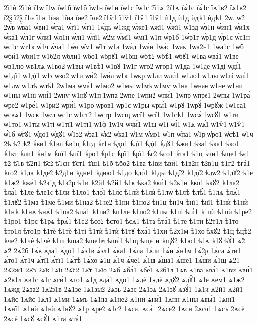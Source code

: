 {2ї1ѝ
2ї1ѝ
ї1ѡ
ї1ѡ
їѡ1б
їѡ1б
їѡ1н
їѡ1н
їѡ1с
їѡ1с
2ї1ѧ
2ї1ѧ
їѧ́1с
їѧ́1с
їѧ1в2
їѧ1в2
ї2ѯ
ї2ѯ
ї1ѳ
ї1ѳ
1їѳа
1їѳа
їѳе2
їѳе2
ї1ѷ1
ї1ѷ1
ї1ѷ1
ї1ѷ1
ѝ1д
ѝ1д
ѝдѣ1
ѝдѣ1
2ѡ.
ѡ2́
2ѡ́в
ѡ́ва1
ѡ́ви1
ѡ́га1
ѡ́гї1
ѡ́гї1
1ѡ́дь
ѡ́1жд
ѡ́же1
ѡ́жї1
ѡ́жї1
ѡ́1зд
ѡ́з1н
ѡ́ин1
ѡ́и1х
ѡ́ка1
ѡ́л1г
ѡ́ли1
ѡ́л1н
ѡ́лї1
ѡ́лї1
ѡ́2м
ѡ́мї1
ѡ́мї1
ѡ́1п
ѡ́р1б
1ѡ́р1г
ѡ́р1д
ѡ́р1с
ѡ́с1н
ѡ́с1с
ѡ́т1к
ѡ́1ч
ѡ́ча1
1ѡ́ѳ
ѡ̑м1
ѡ̑1т
ѡ1а
1ѡа́д
1ѡа́н
1ѡа́с
1ѡак
1ѡа2н1
1ѡа1с
1ѡб
ѡби́1
ѡби1т
ѡ1б2л
ѡбли1
ѡбо1
ѡбрꙋ1
ѡ1бщ
ѡбѣ2
ѡбѣ́1
ѡбꙋ1
ѡ1ва
ѡва́1
ѡ1ве
ѡв1лю
ѡв1лѧ
ѡ1во2
ѡ1вы
ѡ1вѣ1
ѡ1вꙋ
1ѡ1г
ѡго2
ѡгор1
ѡ1да
1ѡ1де
ѡ1ді
ѡді́1
ѡ1дї1
ѡ1дї1
ѡ1з
ѡзо2
ѡ1и
ѡи́2
1ѡи́л
ѡ1к
1ѡкр
ѡ1ли
ѡли́1
ѡ1ло1
ѡ1лы
ѡ1лі
ѡлі́1
ѡ1лѡ
ѡ1лѣ
ѡлѣ́1
2ѡ1ма
ѡма́1
ѡ1мо2
ѡ1мы
ѡ1мѣ
ѡ1мѵ
ѡ1на
1ѡнаѳ
ѡ1не
ѡ1ни
ѡ1ны
ѡ1ні
ѡні́1
2ѡнѵ
ѡ1нꙋ
ѡ1п
1ѡпа
2ѡпе
1ѡпи2
ѡпи́1
1ѡпр
ѡпре1
2ѡпы
1ѡ1ра́
ѡре2
ѡ1ре́1
ѡ1ри2
ѡри́1
ѡ1ро
ѡров1
ѡр1с
ѡ1ры
ѡры́1
ѡ1рꙋ
1ѡрꙋ́
1ѡрꙋж
1ѡ1са1
ѡсвѧ1
1ѡск
1ѡсл
ѡс1с
ѡ1ст2
1ѡстр
1ѡсщ
ѡсї1
ѡсї1
1ѡ1сѣ1
1ѡсѧ́
1ѡсꙋ1
ѡ1ти
ѡ1то1
ѡ1ты
ѡ1ті
ѡ1тї1
ѡ1тї1
ѡ1ф
1ѡ1ч
ѡчи́1
ѡ1ш
ѡ1і
ѡі́1
ѡ1ѧ
ѡѧ́1
ѡ1ѷ1
ѡ1ѷ1
ѡ҆́1б
ѡ҆гꙋ1
ѡ҆до1
ѡ҆дꙋ1
ѡ҆1з2
ѡ҆за1
ѡ҆к2
ѡ҆ка1
ѡ҆1м
ѡ҆мо1
ѡ҆1п
ѡ҆па1
ѡ҆1р
ѡ҆ро1
ѡ҆сѣ1
ѡ҆1ч
2ѣ
ѣ2̀
ѣ2́
ѣ́ви1
ѣ́1вл
ѣ́в1ц
ѣ́1гд
ѣ́г1н
ѣ́до1
ѣ́дї1
ѣ́дї1
ѣ́дꙋ1
ѣ́жи1
ѣ́за1
ѣ́ка1
ѣ́ко1
ѣ́1кт
ѣ́ли1
ѣ́н1м
ѣ́пї1
ѣ́пї1
ѣ́ро1
ѣ́р1с
ѣ́рї1
ѣ́рї1
ѣ́с2
ѣ́со1
ѣ́та1
ѣ́1ц
ѣ́чи1
ѣ́ще1
ѣ́є1
ѣ2̑
ѣ̑1в
ѣ̑2п1
ѣ̑с2
ѣ̑1сн
ѣ̑ст1
ѣ̑ш1
ѣ1б
ѣбо2
ѣ1ва
ѣ1ви
ѣви́1
ѣ1в2н
ѣ2в1ц
ѣ1г2
ѣга́1
ѣго2
ѣ1да
ѣ1де2
ѣ2д1н
ѣдне1
ѣдню1
ѣ1до
ѣдо́1
ѣ1ды
ѣ1дї2
ѣ1дї2
ѣдѡ2
ѣ1дꙋ2
ѣ1е
ѣ1ж2
ѣже́1
ѣ2з1д
ѣ1з2р
ѣ1и
ѣ2й1
ѣ2й1
ѣ1к
ѣка2
ѣки́1
ѣ2к1н
ѣко́1
ѣкꙋ2
ѣ1ла2
ѣла́1
ѣ1ле
ѣле1с
ѣ1ли
ѣ1ло1
ѣло́1
ѣ1лє
ѣ1лѝ
ѣ1лѝ
ѣ1лѡ
ѣ1лѣ
ѣлѣ́1
ѣ1лѧ
ѣлѧ́1
ѣ1лꙋ2
ѣ1ма
ѣ1ме
ѣ1ми
ѣ1на2
ѣ1не2
ѣ1ни
ѣ1но2
ѣн1ц
ѣн1ч
ѣнї1
ѣнї1
ѣ1нѝ
ѣ1нѝ
ѣ1нѣ
ѣ1нѧ
ѣнѧ́1
ѣ1па2
ѣпа́1
ѣ1пи2
ѣп1ле
ѣ1по2
ѣ1пы
ѣ1пі
ѣпі́1
ѣ1пѝ
ѣ1пѝ
ѣ1ре2
ѣ1ро1
ѣ1рє
ѣ1рѧ
ѣрѧ́1
ѣ1с2
ѣсо2
ѣсто1
ѣсѧ1
ѣ1та
ѣта́1
ѣ1те
ѣ1ти
ѣ2т1л
ѣ1то
ѣто1л
ѣто1р
ѣ1тѐ
ѣ1тѐ
ѣ1ті
ѣ1тѝ
ѣ1тѝ
ѣ1тꙋ
ѣха́1
ѣ1хи
ѣ2х1м
ѣ1хо
ѣхꙋ2
ѣ1ц
ѣцѣ2
ѣче2
ѣ1чѐ
ѣ1чѐ
ѣ1ш
ѣша2
ѣше1м
ѣшє́1
ѣ1щ
ѣще1н
ѣщꙋ2
ѣ1ю1
ѣ1ѧ
ѣ1ꙋ
ѣꙋ́1
ѧ2̀
ѧ2́
2ѧ́2б
1ѧ́в
ѧ́да1
ѧ́до1
1ѧ́з1в
ѧ́зл1
ѧ́ка1
1ѧ́ла
1ѧ́ли
1ѧ́н
ѧ́н1м
1ѧ́2р
1ѧ́са
ѧ́ти1
ѧ́то1
ѧ́т1ч
ѧ́тї1
ѧ́тї1
1ѧ́тѣ
1ѧ́хо
ѧ́1ц
ѧ́1ч
ѧ́че1
ѧ́1ш
ѧ́ша1
ѧ́ше1
1ѧ́ши
ѧ́1щ
ѧ2̑1
2ѧ̑2ж1
2ѧ̑з
2ѧ̑к
1ѧ̑н
2ѧ̑с2
1ѧ̑т
1ѧ̑ю
2ѧб
ѧба́1
ѧбе́1
ѧ2б1л
1ѧв
ѧ1ва
ѧва́1
ѧ1ви
ѧви́1
ѧ2в1л
ѧв1с
ѧ1г
ѧги́1
ѧго1
ѧ1д
ѧда́1
ѧдо1
1ѧдѐ
1ѧдѐ
ѧдꙋ2
ѧдꙋ̑1
ѧ1е
ѧем1
ѧ1ж2
1ѧжд
2ѧза2
1ѧ2з1в
2ѧ1зе
1ѧ1зы2
2ѧзь
2ѧзє
2ѧ1зѧ
2ѧ1зꙋ
ѧзꙋ́1
1ѧ1и
ѧ2й1
ѧ2й1
1ѧйс
1ѧйс
1ѧл1
ѧ1ми
1ѧмъ
1ѧ1на
ѧ1не2
ѧ1ни
ѧни́1
1ѧнн
ѧ1ны
ѧны́1
1ѧнї1
1ѧнї1
ѧ1нѝ
ѧ1нѝ
ѧ1нꙋ2
ѧ1р
ѧре2
ѧ1с2
1ѧса.
ѧса́1
2ѧсе2
1ѧсн
2ѧсо1
1ѧсъ
2ѧсѐ
2ѧсѐ
1ѧсꙋ
ѧсꙋ́1
ѧ1та
ѧта́1
}
